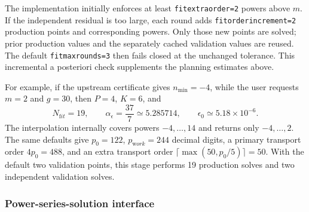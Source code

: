 \documentclass[11pt]{article}
\newcommand{\eps}{\epsilon}
\renewcommand{\_}{\origunderscore\allowbreak}
\begin{document}
The implementation initially enforces at least
\texttt{fit\_extra\_order=2} powers above $m$.  If the independent residual is too large,
each round adds \texttt{fit\_order\_increment=2} production points and corresponding powers.
Only those new points are solved; prior production values and the separately cached validation
values are reused.  The default \texttt{fit\_max\_rounds=3} then fails closed at the unchanged
tolerance.  This incremental a posteriori check supplements the planning estimates above.

For example, if the upstream certificate gives $n_{\min}=-4$, while the user requests
$m=2$ and $g=30$, then $P=4$, $K=6$, and
\begin{equation}
 N_{\mathrm fit}=19,\qquad
 \alpha_\eps=\frac{37}{7}\simeq5.285714,
 \qquad \eps_0\simeq5.18\times10^{-6}.
\end{equation}
The interpolation internally covers powers $-4,\ldots,14$ and returns only
$-4,\ldots,2$.  The same defaults give $p_0=122$, $p_{\mathrm work}=244$ decimal
digits, a primary transport order $4p_0=488$, and an extra transport order
$\lceil\max(50,p_0/5)\rceil=50$.  With the default two validation points, this stage performs
19 production solves and two independent validation solves.

\subsubsection{Power-series-solution interface}
\end{document}
